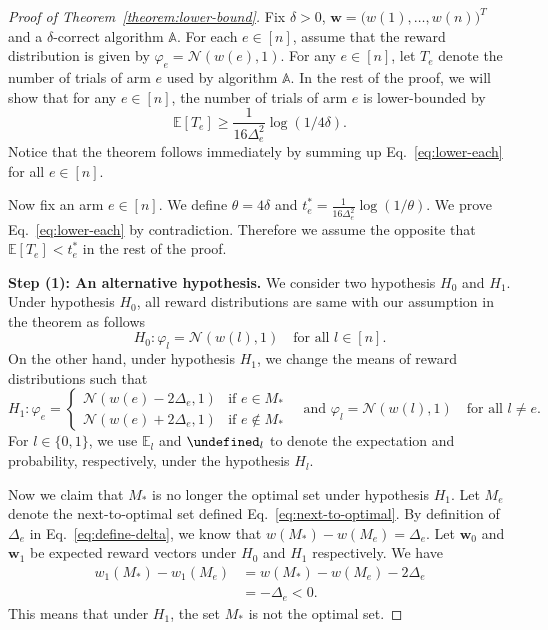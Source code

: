 \documentclass{article}
\newcommand{\Rew}{\varphi}
\newcommand{\E}{\mathbb E}
\let\Pr\undefined
\DeclareMathOperator{\Pr}{Pr}
\renewcommand{\vec}[1]{\boldsymbol{#1}}
\begin{document}
\begin{proof}[Proof of Theorem~\ref{theorem:lower-bound}]
Fix $\delta >0$, $\vec w =\big(w(1),\ldots,w(n)\big)^T$ and a $\delta$-correct algorithm $\mathbb A$.
For each $e\in [n]$, assume that the reward distribution is given by $\Rew_e=\mathcal N(w(e),1)$.
For any $e\in [n]$, let $T_e$ denote the  number of trials of arm $e$ used by algorithm $\mathbb A$.
In the rest of the proof, we will show that for any $e\in [n]$, the number of trials of arm $e$ is lower-bounded by
\begin{equation}
\E[T_e] \ge \frac{1}{16\Delta_e^2}\log(1/4\delta).
\label{eq:lower-each}
\end{equation}
Notice that the theorem follows immediately by summing up Eq.~\eqref{eq:lower-each} for all $e\in[n]$.

Now fix an arm $e\in [n]$.  
We define $\theta=4\delta$ and $t_e^* = \frac{1}{16\Delta_e^2}\log(1/\theta)$.
We prove Eq.~\eqref{eq:lower-each} by contradiction. 
Therefore we assume the opposite that $\E[T_e] < t_e^*$ in the rest of the proof.


\textbf{Step (1): An alternative hypothesis.}
We consider two hypothesis $H_0$ and $H_1$. 
Under hypothesis $H_0$, all reward distributions are same with our assumption in the theorem as follows
$$
H_0: \Rew_l = \mathcal N(w(l),1) \quad \text{for all } l \in [n].
$$
On the other hand, under hypothesis $H_1$, we change the means of reward distributions such that 
$$
H_1: 
	\Rew_e = \begin{cases}
	\mathcal N(w(e)-2\Delta_e,1) & \text{if } e\in M_*\\
	\mathcal N(w(e)+2\Delta_e,1) & \text{if } e\not\in M_*
\end{cases} 
\quad\text{and } \Rew_l=\mathcal N(w(l), 1) \quad\text{for all } l\not = e.
$$
For $l\in \{0,1\}$, we use $\E_l$ and $\Pr_l$ to denote the expectation and probability, respectively, under the hypothesis $H_l$.


Now we claim that $M_*$ is no longer the optimal set under hypothesis $H_1$. 
Let $M_e$ denote the next-to-optimal set defined Eq.~\eqref{eq:next-to-optimal}.
By definition of $\Delta_e$ in Eq.~\eqref{eq:define-delta}, we know that $w(M_*)-w(M_e)=\Delta_e$.
Let $\vec w_0$ and $\vec w_1$ be expected reward vectors under $H_0$ and $H_1$ respectively.
We have
\begin{align*}
w_1(M_*)-w_1(M_e) &= w(M_*)-w(M_e)-2\Delta_e \\
								  &= -\Delta_e < 0.
\end{align*}
This means that under $H_1$, the set $M_*$ is not the optimal set.


\end{proof}
\end{document}
